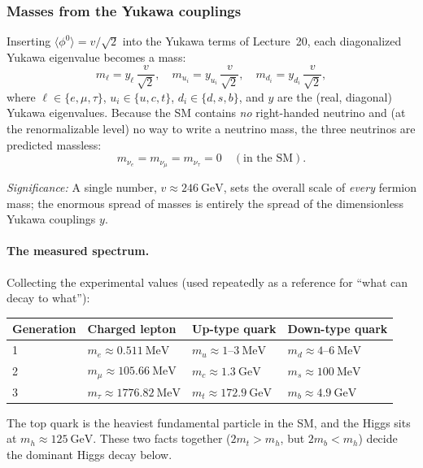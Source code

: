 \subsubsection*{Masses from the Yukawa couplings}

Inserting $\langle\phi^0\rangle=v/\sqrt2$ into the Yukawa terms of
Lecture~20, each diagonalized Yukawa eigenvalue becomes a mass:
\begin{equation}
  \boxed{
    m_{\ell} = y_\ell\,\frac{v}{\sqrt2},\quad
    m_{u_i} = y_{u_i}\,\frac{v}{\sqrt2},\quad
    m_{d_i} = y_{d_i}\,\frac{v}{\sqrt2},
  }
  \label{eq:lec21:fermion-masses}
\end{equation}
where $\ell\in\{e,\mu,\tau\}$, $u_i\in\{u,c,t\}$, $d_i\in\{d,s,b\}$, and
$y$ are the (real, diagonal) Yukawa eigenvalues. Because the SM contains
\emph{no} right-handed neutrino and (at the renormalizable level) no way
to write a neutrino mass, the three neutrinos are predicted massless:
\begin{equation}
  \boxed{m_{\nu_e}=m_{\nu_\mu}=m_{\nu_\tau}=0
        \quad(\text{in the SM}).}
  \label{eq:lec21:massless-nu}
\end{equation}

\textit{Significance:} A single number, $v\approx 246~\text{GeV}$, sets
the overall scale of \emph{every} fermion mass; the enormous spread of
masses is entirely the spread of the dimensionless Yukawa couplings $y$.


\paragraph{The measured spectrum.}
Collecting the experimental values (used repeatedly as a reference for
``what can decay to what''):
\begin{center}
\renewcommand{\arraystretch}{1.25}
\begin{tabular}{@{}llll@{}}
  \toprule
  Generation & Charged lepton & Up-type quark & Down-type quark\\
  \midrule
  1 & $m_e\approx 0.511~\text{MeV}$    & $m_u\approx 1\text{--}3~\text{MeV}$  & $m_d\approx 4\text{--}6~\text{MeV}$\\
  2 & $m_\mu\approx 105.66~\text{MeV}$ & $m_c\approx 1.3~\text{GeV}$          & $m_s\approx 100~\text{MeV}$\\
  3 & $m_\tau\approx 1776.82~\text{MeV}$ & $m_t\approx 172.9~\text{GeV}$      & $m_b\approx 4.9~\text{GeV}$\\
  \bottomrule
\end{tabular}
\end{center}
The top quark is the heaviest fundamental particle in the SM, and the
Higgs sits at $m_h\approx 125~\text{GeV}$. These two facts together
($2m_t>m_h$, but $2m_b<m_h$) decide the dominant Higgs decay below.

